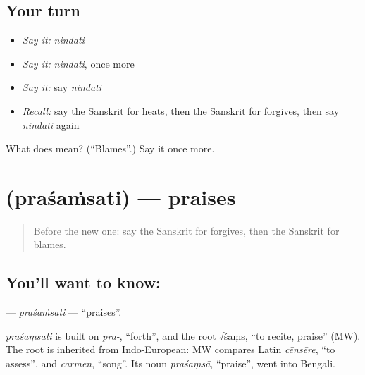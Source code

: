 \subsection*{Your turn}
\begin{itemize}
\raggedright
  \item \emph{Say it:} \emph{nindati}
  \item \emph{Say it:} \emph{nindati}, once more
  \item \emph{Say it:} say \emph{nindati}
  \item \emph{Recall:} say the Sanskrit for heats, then the Sanskrit for forgives, then say \emph{nindati} again
\end{itemize}

\begin{tcolorbox}[breakable,colback=teal!4,colframe=teal!35!black,title={Before you move on}]
What does  mean? (\textquotedblleft{}Blames\textquotedblright{}.) Say it once more.
\end{tcolorbox}
\section[\texorpdfstring{\sk{प्रशंसति} (praśaṁsati)}{प्रशंसति (praśaṁsati)}]{ (praśaṁsati) — praises}

\label{lesson:SA-C205-prasamsati}



\begin{quote}
Before the new one: say the Sanskrit for forgives, then the Sanskrit for blames.
\end{quote}

\subsection*{You'll want to know: }
\textbf{} — \emph{praśaṁsati} — \textquotedblleft{}praises\textquotedblright{}.

\begin{cousinweb}
\emph{praśaṃsati} is built on \emph{pra-}, \textquotedblleft{}forth\textquotedblright{}, and the root √śaṃs, \textquotedblleft{}to recite, praise\textquotedblright{} (MW). The root is inherited from Indo-European: MW compares Latin \emph{cēnsēre}, \textquotedblleft{}to assess\textquotedblright{}, and \emph{carmen}, \textquotedblleft{}song\textquotedblright{}. Its noun \emph{praśaṃsā}, \textquotedblleft{}praise\textquotedblright{}, went into Bengali.
\end{cousinweb}

